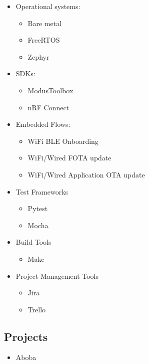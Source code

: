\begin{itemize}
    \item Operational systems:
    \begin{itemize}
        \item Bare metal
        \item FreeRTOS
        \item Zephyr
    \end{itemize}

    \item SDKs:
    \begin{itemize}
        \item ModusToolbox
        \item nRF Connect
    \end{itemize}

    \item Embedded Flows:
    \begin{itemize}
        \item WiFi BLE Onboarding
        \item WiFi/Wired FOTA update
        \item WiFi/Wired Application OTA update
    \end{itemize}

    \item Test Frameworks
    \begin{itemize}
        \item Pytest
        \item Mocha
    \end{itemize}

    \item Build Tools
    \begin{itemize}
        \item Make
    \end{itemize}

    \item Project Management Tools
    \begin{itemize}
        \item Jira
        \item Trello
    \end{itemize}

\end{itemize}

\subsection{Projects}

\begin{itemize}
    \item Aboba
\end{itemize}

\newpage

